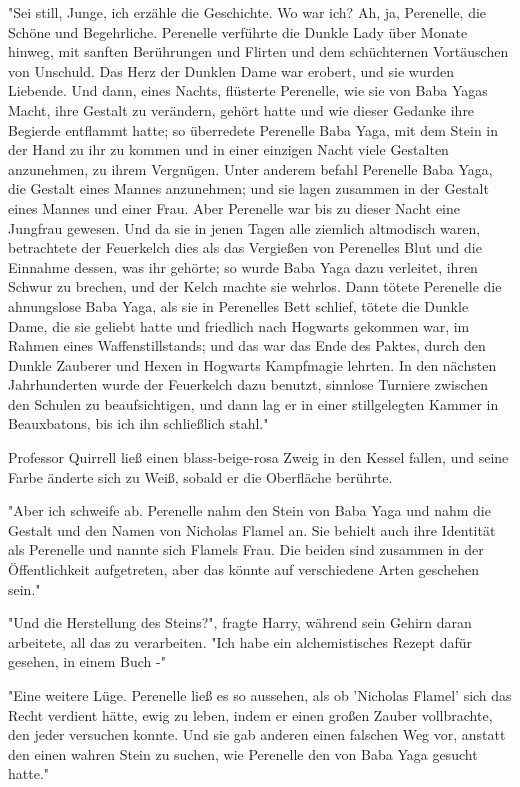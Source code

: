 {"Sei still, Junge, ich erzähle die Geschichte. Wo war ich? Ah, ja, Perenelle, die Schöne und Begehrliche. Perenelle verführte die Dunkle Lady über Monate hinweg, mit sanften Berührungen und Flirten und dem schüchternen Vortäuschen von Unschuld. Das Herz der Dunklen Dame war erobert, und sie wurden Liebende. Und dann, eines Nachts, flüsterte Perenelle, wie sie von Baba Yagas Macht, ihre Gestalt zu verändern, gehört hatte und wie dieser Gedanke ihre Begierde entflammt hatte; so überredete Perenelle Baba Yaga, mit dem Stein in der Hand zu ihr zu kommen und in einer einzigen Nacht viele Gestalten anzunehmen, zu ihrem Vergnügen. Unter anderem befahl Perenelle Baba Yaga, die Gestalt eines Mannes anzunehmen; und sie lagen zusammen in der Gestalt eines Mannes und einer Frau. Aber Perenelle war bis zu dieser Nacht eine Jungfrau gewesen. Und da sie in jenen Tagen alle ziemlich altmodisch waren, betrachtete der Feuerkelch dies als das Vergießen von Perenelles Blut und die Einnahme dessen, was ihr gehörte; so wurde Baba Yaga dazu verleitet, ihren Schwur zu brechen, und der Kelch machte sie wehrlos. Dann tötete Perenelle die ahnungslose Baba Yaga, als sie in Perenelles Bett schlief, tötete die Dunkle Dame, die sie geliebt hatte und friedlich nach Hogwarts gekommen war, im Rahmen eines Waffenstillstands; und das war das Ende des Paktes, durch den Dunkle Zauberer und Hexen in Hogwarts Kampfmagie lehrten. In den nächsten Jahrhunderten wurde der Feuerkelch dazu benutzt, sinnlose Turniere zwischen den Schulen zu beaufsichtigen, und dann lag er in einer stillgelegten Kammer in Beauxbatons, bis ich ihn schließlich stahl."

Professor Quirrell ließ einen blass-beige-rosa Zweig in den Kessel fallen, und seine Farbe änderte sich zu Weiß, sobald er die Oberfläche berührte.

"Aber ich schweife ab. Perenelle nahm den Stein von Baba Yaga und nahm die Gestalt und den Namen von Nicholas Flamel an. Sie behielt auch ihre Identität als Perenelle und nannte sich Flamels Frau. Die beiden sind zusammen in der Öffentlichkeit aufgetreten, aber das könnte auf verschiedene Arten geschehen sein."

"Und die Herstellung des Steins?", fragte Harry, während sein Gehirn daran arbeitete, all das zu verarbeiten. "Ich habe ein alchemistisches Rezept dafür gesehen, in einem Buch -"

"Eine weitere Lüge. Perenelle ließ es so aussehen, als ob 'Nicholas Flamel' sich das Recht verdient hätte, ewig zu leben, indem er einen großen Zauber vollbrachte, den jeder versuchen konnte. Und sie gab anderen einen falschen Weg vor, anstatt den einen wahren Stein zu suchen, wie Perenelle den von Baba Yaga gesucht hatte."

}
